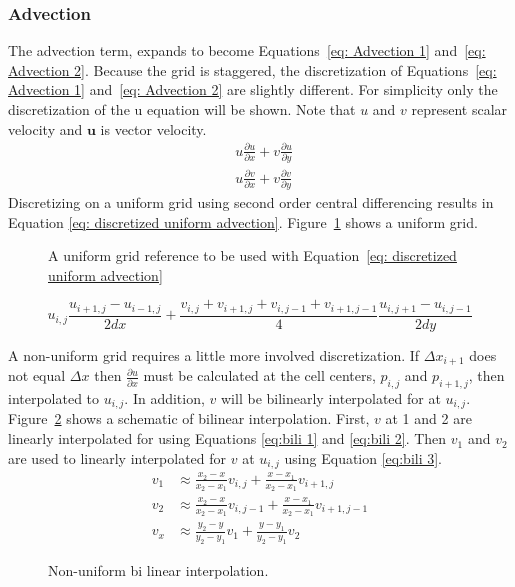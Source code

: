 \documentclass[onehalf,11pt]{beavtex}
\begin{document}
\subsubsection{Advection}\label{ID: Advection}
The advection term, expands to become Equations~\eqref{eq: Advection 1} and~\eqref{eq: Advection 2}. 
Because the grid is staggered, the discretization of Equations~\eqref{eq: Advection 1} and~\eqref{eq: Advection 2} are slightly different.
For simplicity only the discretization of the u equation will be shown.
Note that $u$ and $v$ represent scalar velocity and $\textbf{u}$ is vector velocity.
\begin{align}
&u\frac{\partial u}{\partial x} + v\frac{\partial u}{\partial y} \label{eq: Advection 1} \\ 
&u\frac{\partial v}{\partial x} + v\frac{\partial v}{\partial y} \; \label{eq: Advection 2}
\end{align}
Discretizing on a uniform grid using second order central differencing results in Equation \eqref{eq: discretized uniform advection}.
Figure~\ref{fig:discretized uniform advection} shows a uniform grid.
\begin{figure}[htb]
	\centering
	
	\caption{A uniform grid reference to be used with Equation~\eqref{eq: discretized uniform advection}}
	\label{fig:discretized uniform advection}
\end{figure}
\begin{equation}
u_{i,j}\frac{u_{i+1,j} - u_{i-1,j}}{2dx} + \frac{v_{i,j} + v_{i+1,j} + v_{i,j-1} + v_{i+1,j-1}}{4}\frac{u_{i,j+1} - u_{i,j-1}}{2dy} \label{eq: discretized uniform advection}
\end{equation}

A non-uniform grid requires a little more involved discretization. 
If $\Delta x_{i+1}$ does not equal $\Delta x$ then $\frac{\partial u}{\partial x}$ must be calculated at the cell centers, $p_{i,j}$ and $p_{i+1,j}$, then interpolated to $u_{i,j}$. 
In addition, $v$ will be bilinearly interpolated for at $u_{i,j}$.
Figure~\ref{fig:bi-linear-interpolation} shows a schematic of bilinear interpolation.
First, $v$ at 1 and 2 are linearly interpolated for using Equations \eqref{eq:bili 1} and \eqref{eq:bili 2}.
Then $v_1$ and $v_2$ are used to linearly interpolated for $v$ at $u_{i,j}$ using Equation \eqref{eq:bili 3}.
\begin{align}
v_1 &\approx \frac{x_2 - x}{x_2 - x_1}v_{i,j} + \frac{x - x_1}{x_2 - x_1}v_{i+1,j} \label{eq:bili 1} \\
v_2 &\approx \frac{x_2 - x}{x_2 - x_1}v_{i,j-1} + \frac{x - x_1}{x_2 - x_1}v_{i+1,j-1} \label{eq:bili 2} \\
v_x &\approx \frac{y_2 - y}{y_2 - y_1}v_{1} + \frac{y - y_1}{y_2 - y_1}v_{2} \; \label{eq:bili 3}
\end{align}
\begin{figure}[htb]
	\centering
	
	\caption{Non-uniform bi linear interpolation.}
	\label{fig:bi-linear-interpolation}
\end{figure}
\end{document}
